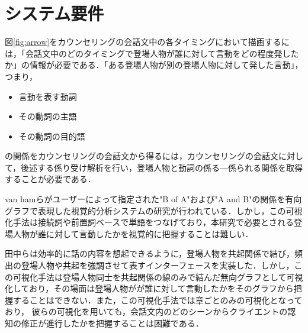\documentclass[shuuron]{kuee}
\begin{document}
\section{システム要件}%

%


図\ref{fig:arrow}をカウンセリングの会話文中の各タイミングにおいて描画するには，「会話文中のどのタイミングで登場人物が誰に対して言動をどの程度発したか」の情報が必要である．「ある登場人物が別の登場人物に対して発した言動」，つまり，
\begin{itemize}
  \item 言動を表す動詞
  \item その動詞の主語
  \item その動詞の目的語
\end{itemize}
の関係をカウンセリングの会話文から得るには，カウンセリングの会話文に対して，後述する係り受け解析を行い，登場人物と動詞の係る―係られる関係を取得することが必要である．

van hamら\cite{van2009mapping}がユーザーによって指定された"B of A"および"A and B"の関係を有向グラフで表現した視覚的分析システムの研究が行われている．しかし，この可視化手法は接続詞や前置詞ベースで単語をつなげており，本研究で必要とされる登場人物が誰に対して言動したかを視覚的に把握することは難しい．

田中ら\cite{tanaka}は効率的に話の内容を想起できるように，登場人物を共起関係で結び，頻出の登場人物や共起を強調させて表すインターフェースを実装した．しかし，この可視化手法は登場人物同士を共起関係の線のみで結んだ無向グラフとして可視化しており，その場面は登場人物がが誰に対して言動したかをそのグラフから把握することはできない．また，この可視化手法では章ごとのみの可視化となっており， 彼らの可視化を用いても，会話文内のどのシーンからクライエントの認知の修正が進行したかを把握することは困難である．
\end{document}
